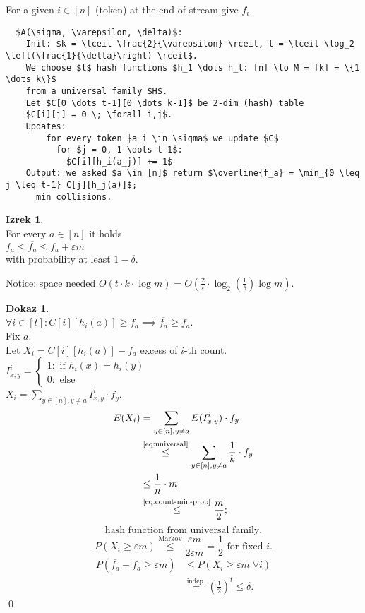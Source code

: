 \documentclass[a4paper, 12pt]{book}
\theoremstyle{definition}
\newtheorem{theorem}[counter]{Izrek}
\newtheorem{pro}[counter]{Dokaz}
\theoremstyle{remark}
\begin{document}
For a given $i \in [n]$ (token) at the end of stream give $f_i$.
\begin{lstlisting}
  $A(\sigma, \varepsilon, \delta)$:
    Init: $k = \lceil \frac{2}{\varepsilon} \rceil, t = \lceil \log_2 \left(\frac{1}{\delta}\right) \rceil$.
    We choose $t$ hash functions $h_1 \dots h_t: [n] \to M = [k] = \{1 \dots k\}$
    from a universal family $H$.
    Let $C[0 \dots t-1][0 \dots k-1]$ be 2-dim (hash) table
    $C[i][j] = 0 \; \forall i,j$.
    Updates:
        for every token $a_i \in \sigma$ we update $C$
          for $j = 0, 1 \dots t-1$:
            $C[i][h_i(a_j)] += 1$
    Output: we asked $a \in [n]$ return $\overline{f_a} = \min_{0 \leq j \leq t-1} C[j][h_j(a)]$;
      min collisions.
\end{lstlisting}
\begin{theorem} \text{} \\
  For every $a \in [n]$ it holds \\
  $f_a \leq \overline{f_a} \leq f_a + \varepsilon m$ \\
  with probability at least $1 - \delta$.
\end{theorem}
Notice: space needed $O(t \cdot k \cdot \log m) =
O\left(\frac{2}{\varepsilon} \cdot \log_2 \left(\frac{1}{\delta}\right) \log m\right)$.
\begin{pro} \text{} \\
  $\forall i \in [t]: C[i][h_i(a)] \geq f_a \implies \overline{f_a} \geq f_a$. \\
  Fix $a$. \\
  Let $X_i = C[i][h_i(a)] - f_a$ excess of $i$-th count. \\
  $I_{x,y}^i = \begin{cases}
    1: \text{ if } h_i(x) = h_i(y) \\
    0: \text{ else}
  \end{cases}$ \\
  $X_i = \sum_{y \in [n], y \neq a} I_{x,y}^i \cdot f_y$.
  \begin{align*}
    E(X_i) &= \sum_{y \in [n], y \neq a} E(I_{x,y}^i) \cdot f_y \\
    &\stackrel{\refeq{eq:universal}}{\leq} \sum_{y \in [n], y \neq a} \frac{1}{k} \cdot f_y \\
    &\leq \frac{1}{n} \cdot m \\
    &\stackrel{\refeq{eq:count-min-prob}}{\leq} \frac{m}{2};
  \end{align*}
  \begin{equation}
    \label{eq:universal}
    \text{hash function from universal family,}
  \end{equation}
  \begin{equation}
    \label{eq:count-min-prob}
    P(X_i \geq \varepsilon m) \stackrel{\text{Markov}}{\leq} \frac{\varepsilon m}{2 \varepsilon m} = \frac{1}{2}
    \text{ for fixed } i.
  \end{equation}
  \begin{align*}
    P(\overline{f_a} - f_a \geq \varepsilon m) &\leq P(X_i \geq \varepsilon m \; \forall i) \\
    &\stackrel{\text{indep.}}{=} \left(\frac{1}{2}\right)^t \leq \delta.
  \end{align*}
  \qed
\end{pro}
\end{document}
